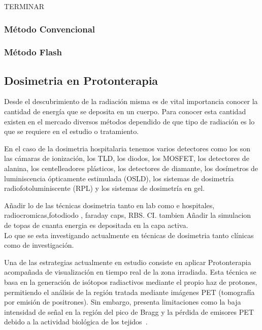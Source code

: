 \documentclass[onecolumn,12pt]{article} %
\begin{document}
TERMINAR



\subsubsection{Método Convencional}

\subsubsection{Método Flash}








\subsection{Dosimetria en Protonterapia}
Desde el descubrimiento de la radiación misma es de vital importancia conocer  la cantidad de energía que se deposita en  un cuerpo. Para conocer esta cantidad existen en el mercado diversos métodos dependido de que tipo de radiación  es lo que se requiere en el estudio o tratamiento.

En el caso de la dosimetria hospitalaria tenemos varios detectores como los son las cámaras de ionización, los TLD, los diodos, los MOSFET, los detectores de alanina, los centelleadores plásticos, los detectores de diamante, los dosímetros de luminiscencia ópticamente estimulada (OSLD), los sistemas de dosimetría radiofotoluminiscente (RPL) y los sistemas de dosimetría en gel.





Añadir lo de las técnicas dosimetria tanto en lab como e hospitales, radiocromicas,fotodiodo , faraday caps, RBS. CI.
tambien Añadir la simulacion de topas de cuanta energia es depositada en la capa activa. 
\\


Lo que se esta investigando actualmente en técnicas de dosimetria  tanto clínicas como de investigación.



Una de las estrategias actualmente en estudio consiste en aplicar Protonterapia acompañada de visualización en tiempo real de la zona irradiada. Esta técnica se basa en la generación de isótopos radiactivos mediante el propio haz de protones, permitiendo el análisis de la región tratada mediante imágenes PET (tomografía por emisión de positrones). Sin embargo, presenta limitaciones como la baja intensidad de señal en la región del pico de Bragg y la pérdida de emisores PET debido a la actividad biológica de los tejidos~\cite{parceriza}.
\end{document}
